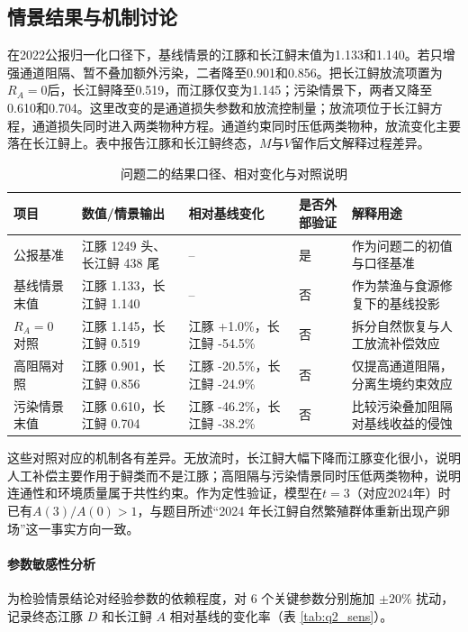 \documentclass{MMCStyle}
\begin{document}
\subsection{情景结果与机制讨论}
在2022公报归一化口径下，基线情景的江豚和长江鲟末值为1.133和1.140。若只增强通道阻隔、暂不叠加额外污染，二者降至0.901和0.856。把长江鲟放流项置为$R_A=0$后，长江鲟降至0.519，而江豚仅变为1.145；污染情景下，两者又降至0.610和0.704。这里改变的是通道损失参数和放流控制量；放流项位于长江鲟方程，通道损失同时进入两类物种方程。通道约束同时压低两类物种，放流变化主要落在长江鲟上。表中报告江豚和长江鲟终态，$M$与$V$留作后文解释过程差异。
\begin{table}[htbp]
\centering
\caption{问题二的结果口径、相对变化与对照说明}
\label{tab:q2_result}
\begin{tabularx}{0.95\textwidth}{>{\raggedright\arraybackslash}p{2.2cm} >{\raggedright\arraybackslash}p{3.6cm} >{\raggedright\arraybackslash}p{2.8cm} >{\raggedright\arraybackslash}p{1.7cm} X}
\toprule
项目 & 数值/情景输出 & 相对基线变化 & 是否外部验证 & 解释用途 \\
\midrule
2022 公报基准 & 江豚 1249 头、长江鲟 438 尾 & -- & 是 & 作为问题二的初值与口径基准 \\
基线情景末值 & 江豚 1.133，长江鲟 1.140 & -- & 否 & 作为禁渔与食源修复下的基线投影 \\
$R_A=0$ 对照 & 江豚 1.145，长江鲟 0.519 & 江豚 +1.0\%，长江鲟 -54.5\% & 否 & 拆分自然恢复与人工放流补偿效应 \\
高阻隔对照 & 江豚 0.901，长江鲟 0.856 & 江豚 -20.5\%，长江鲟 -24.9\% & 否 & 仅提高通道阻隔，分离生境约束效应 \\
污染情景末值 & 江豚 0.610，长江鲟 0.704 & 江豚 -46.2\%，长江鲟 -38.2\% & 否 & 比较污染叠加阻隔对基线收益的侵蚀 \\
\bottomrule
\end{tabularx}
\end{table}
这些对照对应的机制各有差异。无放流时，长江鲟大幅下降而江豚变化很小，说明人工补偿主要作用于鲟类而不是江豚；高阻隔与污染情景同时压低两类物种，说明连通性和环境质量属于共性约束。作为定性验证，模型在$t=3$（对应2024年）时已有$A(3)/A(0)>1$，与题目所述“2024 年长江鲟自然繁殖群体重新出现产卵场”这一事实方向一致。

\paragraph{参数敏感性分析}
为检验情景结论对经验参数的依赖程度，对 6 个关键参数分别施加 $\pm 20\%$ 扰动，记录终态江豚 $D$ 和长江鲟 $A$ 相对基线的变化率（表 \ref{tab:q2_sens}）。
\end{document}
